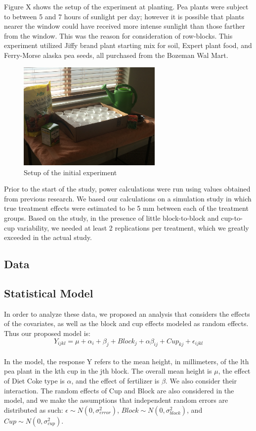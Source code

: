 \documentclass[1p,12pt]{elsarticle}\usepackage[]{graphicx}\usepackage[]{color}
\begin{document}
Figure X shows the setup of the experiment at planting. Pea plants were subject to between 5 and 7 hours of sunlight per day; however it is possible that plants nearer the window could have received more intense sunlight than those farther from the window. This was the reason for consideration of row-blocks. This experiment utilized Jiffy brand plant starting mix for soil, Expert plant food, and Ferry-Morse alaska pea seeds, all purchased from the Bozeman Wal Mart. 

 \begin{figure}[h!]
 	\caption{Setup of the initial experiment}
 	\centering
	\includegraphics[width = 7cm]{figure/setup.JPG}
\end{figure}

Prior to the start of the study, power calculations were run using values obtained from previous research.  We based our calculations on a simulation study in which true treatment effects were estimated to be 5 mm between each of the treatment groups. Based on the study, in the presence of little block-to-block and cup-to-cup variability, we needed at least 2 replications per treatment, which we greatly exceeded in the actual study. 


\subsection{Data}

\subsection{Statistical Model}
In order to analyze these data, we proposed an analysis that considers the effects of the covariates, as well as the block and cup effects modeled as random effects. Thus our proposed model is: 
\\
\begin{equation}
Y_{ijkl} = \mu + \alpha_i + \beta_j + Block_j + \alpha\beta_{ij}+ Cup_{kj} + \epsilon_{ijkl}
\end{equation}
\\
In the model, the response Y refers to the mean height, in millimeters, of the lth pea plant in the kth cup in the jth block. The overall mean height is $\mu$, the effect of Diet Coke type is $\alpha$, and the effect of fertilizer is $\beta$. We also consider their interaction. The random effects of Cup and Block are also considered in the model, and we make the assumptions that independent random errors are distributed as such: $\epsilon \sim N(0,\sigma^2_{error})$, $Block \sim N(0,\sigma^2_{block})$, and $Cup \sim N(0,\sigma^2_{cup})$. 
\end{document}
